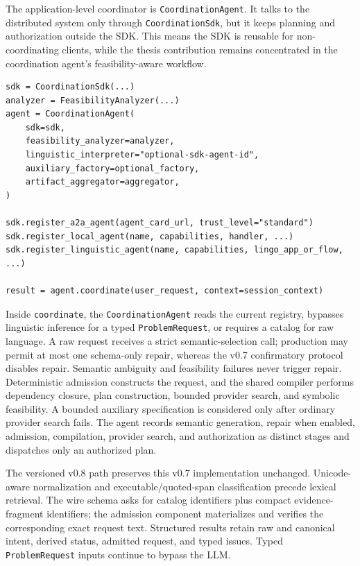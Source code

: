 The application-level coordinator is \texttt{CoordinationAgent}. It talks to the distributed system only through \texttt{CoordinationSdk}, but it keeps planning and authorization outside the SDK. This means the SDK is reusable for non-coordinating clients, while the thesis contribution remains concentrated in the coordination agent's feasibility-aware workflow.

\begin{Verbatim}[fontsize=\small,breaklines=true,breakanywhere=true]
sdk = CoordinationSdk(...)
analyzer = FeasibilityAnalyzer(...)
agent = CoordinationAgent(
    sdk=sdk,
    feasibility_analyzer=analyzer,
    linguistic_interpreter="optional-sdk-agent-id",
    auxiliary_factory=optional_factory,
    artifact_aggregator=aggregator,
)

sdk.register_a2a_agent(agent_card_url, trust_level="standard")
sdk.register_local_agent(name, capabilities, handler, ...)
sdk.register_linguistic_agent(name, capabilities, lingo_app_or_flow, ...)

result = agent.coordinate(user_request, context=session_context)
\end{Verbatim}

Inside \texttt{coordinate}, the \texttt{CoordinationAgent} reads the current registry, bypasses linguistic inference for a typed \texttt{ProblemRequest}, or requires a catalog for raw language. A raw request receives a strict semantic-selection call; production may permit at most one schema-only repair, whereas the v0.7 confirmatory protocol disables repair. Semantic ambiguity and feasibility failures never trigger repair. Deterministic admission constructs the request, and the shared compiler performs dependency closure, plan construction, bounded provider search, and symbolic feasibility. A bounded auxiliary specification is considered only after ordinary provider search fails. The agent records semantic generation, repair when enabled, admission, compilation, provider search, and authorization as distinct stages and dispatches only an authorized plan.

The versioned v0.8 path preserves this v0.7 implementation unchanged. Unicode-aware normalization and executable/quoted-span classification precede lexical retrieval. The wire schema asks for catalog identifiers plus compact evidence-fragment identifiers; the admission component materializes and verifies the corresponding exact request text. Structured results retain raw and canonical intent, derived status, admitted request, and typed issues. Typed \texttt{ProblemRequest} inputs continue to bypass the LLM.

